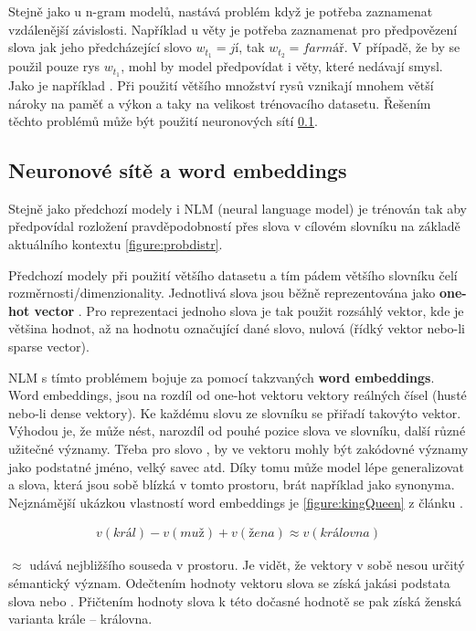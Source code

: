 Stejně jako u n-gram modelů, nastává problém když je potřeba zaznamenat vzdálenější závislosti. Například u věty  je potřeba zaznamenat pro předpovězení slova  jak jeho předcházející slovo $w_{t_1}=jí$, tak $w_{t_2}=farmář$. V případě, že by se použil pouze rys $w_{t_1}$, mohl by model předpovídat i věty, které nedávají smysl. Jako je například . Při použití většího množství rysů vznikají mnohem větší nároky na paměť a výkon a taky na velikost trénovacího datasetu. Řešením těchto problémů může být použití neuronových sítí \ref{subsection:neuralembeddings}.


\subsection{Neuronové sítě a word embeddings}\label{subsection:neuralembeddings}
Stejně jako předchozí modely i NLM (neural language model) je trénován tak aby předpovídal rozložení pravděpodobností přes slova v cílovém slovníku na základě aktuálního kontextu \ref{figure:probdistr}. 

Předchozí modely při použití většího datasetu a tím pádem většího slovníku čelí  rozměrnosti/dimenzionality. Jednotlivá slova jsou běžně reprezentována jako \textbf{one-hot vector} . Pro reprezentaci jednoho slova je tak použit rozsáhlý vektor, kde je většina hodnot, až na hodnotu označující dané slovo, nulová (řídký vektor nebo-li sparse vector).

NLM s tímto problémem bojuje za pomocí takzvaných \textbf{word embeddings}. Word embeddings, jsou na rozdíl od one-hot vektoru vektory reálných čísel (husté nebo-li dense vektory). Ke každému slovu ze slovníku se přiřadí takovýto vektor. Výhodou je, že může nést, narozdíl od pouhé pozice slova ve slovníku, další různé užitečné významy. Třeba pro slovo , by ve vektoru mohly být zakódovné významy jako podstatné jméno, velký savec atd. Díky tomu může model lépe generalizovat a slova, která jsou sobě blízká v tomto prostoru, brát například jako synonyma.
Nejznámější ukázkou vlastností word embeddings je \ref{figure:kingQueen} z článku \cite{kingQueen}.

\begin{align}\label{figure:kingQueen}
  v(král) - v(muž) + v(žena) \approx v(královna)
\end{align}

$\approx$ udává nejbližšího souseda v prostoru. Je vidět, že vektory v sobě nesou určitý sémantický význam. Odečtením hodnoty vektoru slova  se získá jakási podstata slova  nebo . Přičtením hodnoty slova  k této dočasné hodnotě se pak získá ženská varianta krále -- královna.

